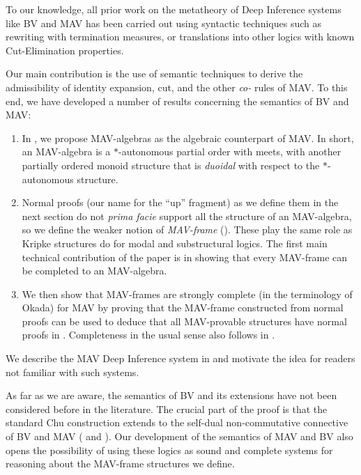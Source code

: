 To our knowledge, all prior work on the metatheory of Deep Inference systems like BV and MAV has been carried out using syntactic techniques such as rewriting with termination measures, or translations into other logics with known Cut-Elimination properties.

Our main contribution is the use of semantic techniques to derive the admissibility of identity expansion, cut, and the other \emph{co-} rules of MAV. To this end, we have developed a number of results concerning the semantics of BV and MAV:
\begin{enumerate}
      \item In , we propose MAV-algebras as the algebraic counterpart of MAV. In short, an MAV-algebra is a $*$-autonomous partial order with meets, with another partially ordered monoid structure that is \emph{duoidal} with respect to the $*$-autonomous structure.
      \item Normal proofs (our name for the ``up'' fragment) as we define them in the next section do not {\it prima facie} support all the structure of an MAV-algebra, so we define the weaker notion of \emph{MAV-frame} (). These play the same role as Kripke structures do for modal and substructural logics. The first main technical contribution of the paper is in showing that every MAV-frame can be completed to an MAV-algebra.
      \item We then show that MAV-frames are strongly complete (in the terminology of Okada) for MAV by proving that the MAV-frame constructed from normal proofs can be used to deduce that all MAV-provable structures have normal proofs in . Completeness in the usual sense also follows in .
\end{enumerate}

We describe the MAV Deep Inference system in  and motivate the idea for readers not familiar with such systems.

As far as we are aware, the semantics of BV and its extensions have not been considered before in the literature. The crucial part of the proof is that the standard Chu construction extends to the self-dual non-commutative connective of BV and MAV ( and ). Our development of the semantics of MAV and BV also opens the possibility of using these logics as sound and complete systems for reasoning about the MAV-frame structures we define.

